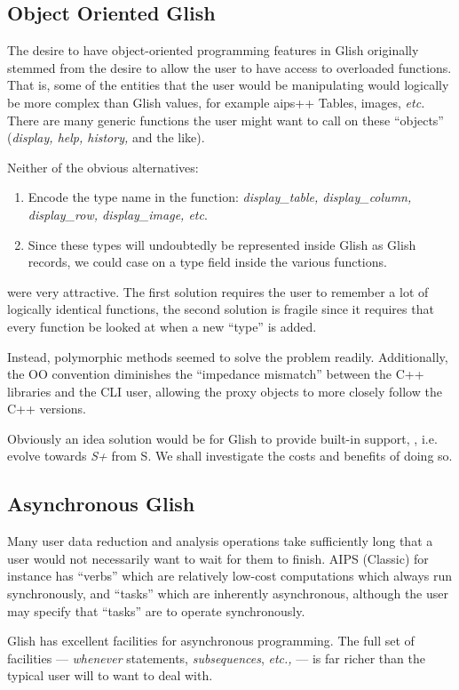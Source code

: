 \subsection{Object Oriented Glish}
The desire to have object-oriented programming features in Glish
originally stemmed from the desire to allow the user to have access to
overloaded functions. That is, some of the entities that the user
would be manipulating would logically be more complex than Glish
values, for example {\sc aips++} Tables, images, {\em etc.} There are
many generic functions the user might want to call on these
``objects'' ({\em display, help, history, } and the like).

Neither of the obvious alternatives:
\begin{enumerate}
\item Encode the type name in the function: {\em display\_table,
      display\_column, display\_row, display\_image, etc}.
\item Since these types will undoubtedly be represented inside Glish
      as Glish records, we could case on a type field inside the
      various functions.
\end{enumerate}
were very attractive. The first solution requires the user to remember
a lot of logically identical functions, the second solution is fragile
since it requires that every function be looked at when a new ``type''
is added.

Instead, polymorphic methods seemed to solve the problem readily.
Additionally, the OO convention diminishes the ``impedance mismatch''
between the C++ libraries and the CLI user, allowing the proxy objects
to more closely follow the C++ versions.

Obviously an idea solution would be for Glish to provide built-in
support, {\em}, i.e. evolve towards {\em S+} from {S}. We shall
investigate the costs and benefits of doing so.

\subsection{Asynchronous Glish}
Many user data reduction and analysis operations take sufficiently
long that a user would not necessarily want to wait for them to
finish. AIPS (Classic) for instance has ``verbs'' which are relatively
low-cost computations which always run synchronously, and ``tasks''
which are inherently asynchronous, although the user may specify that
``tasks'' are to operate synchronously.

Glish has excellent facilities for asynchronous programming. The full
set of facilities --- {\em whenever} statements, {\em subsequences},
{\em etc.,} --- is far richer than the typical user will to want to
deal with.

